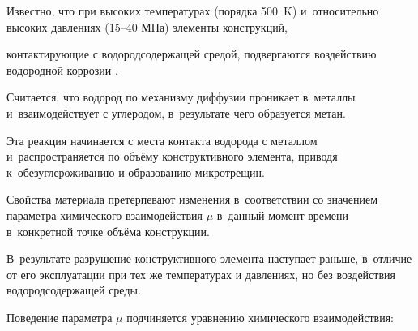 





\date{02/V/2011}




\maketitle



\small \vspace{-3mm}



Известно, что при высоких температурах (порядка 500~K) и~относительно высоких давлениях (15--40 МПа) элементы конструкций,

контактирующие с водородсодержащей средой, подвергаются воздействию водородной коррозии \cite{bubnov:bib1}. 

Считается, что водород по механизму диффузии проникает в~металлы и~взаимодействует с углеродом, в~результате чего образуется метан.

Эта реакция начинается с места контакта водорода с металлом и~распространяется по объёму конструктивного элемента, приводя к~обезуглероживанию и  образованию микротрещин. 

Свойства материала претерпевают изменения в~соответствии со значением параметра химического взаимодействия $\mu $ в~данный момент времени в~конкретной точке объёма конструкции. 

В~результате разрушение конструктивного элемента наступает раньше, в~отличие от его  эксплуатации при тех же температурах и давлениях, но без воздействия водородсодержащей среды. 

Поведение параметра $\mu $ подчиняется уравнению химического взаимодействия:

